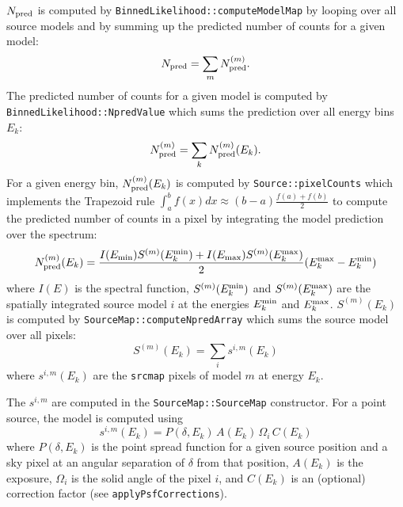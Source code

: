 \documentclass{article}[12pt,a4]
\begin{document}
$N_{\rm pred}$ is computed by
{\tt BinnedLikelihood::computeModelMap}
by looping over all source models and by summing up the predicted number of
counts for a given model:
\begin{equation}
N_{\rm pred} = \sum_m N_{\rm pred}^{(m)} .
\end{equation}
The predicted number of counts for a given model is computed by
{\tt BinnedLikelihood::NpredValue}
which sums the prediction over all energy bins $E_k$:
\begin{equation}
N_{\rm pred}^{(m)} = \sum_k N_{\rm pred}^{(m)}(E_k) .
\end{equation}
For a given energy bin, $N_{\rm pred}^{(m)}(E_k)$ is computed by 
{\tt Source::pixelCounts} which implements the Trapezoid rule
$\int_a^b f(x) dx \approx (b-a) \frac{f(a) + f(b)}{2}$
to compute the predicted number of counts in a pixel by integrating the
model prediction over the spectrum:
\begin{equation}
N_{\rm pred}^{(m)}(E_k) = \frac{
I(E_{\rm min}) S^{(m)}(E_k^{\rm min}) + I(E_{\rm max}) S^{(m)}(E_k^{\rm max})}{2} 
( E_k^{\rm max} - E_k^{\rm min} )
\end{equation}
where
$I(E)$ is the spectral function,
$S^{(m)}(E_k^{\rm min})$ and $S^{(m)}(E_k^{\rm max})$ are the spatially integrated source
model $i$ at the energies $E_k^{\rm min}$ and $E_k^{\rm max}$.
$S^{(m)}(E_k)$ is computed by
{\tt SourceMap::computeNpredArray}
which sums the source model over all pixels:
\begin{equation}
S^{(m)}(E_k) = \sum_i s^{i,m}(E_k)
\end{equation}
where
$s^{i,m}(E_k)$ are the {\tt srcmap} pixels of model $m$ at energy $E_k$.

The $s^{i,m}$ are computed in the {\tt SourceMap::SourceMap} constructor.
For a point source, the model is computed using
\begin{equation}
s^{i,m}(E_k) = P(\delta, E_k) \, A(E_k) \, \Omega_i \, C(E_k)
\end{equation}
where
$P(\delta, E_k)$ is the point spread function for a given source position and
a sky pixel at an angular separation of $\delta$ from that position,
$A(E_k)$ is the exposure,
$\Omega_i$ is the solid angle of the pixel $i$, and
$C(E_k)$ is an (optional) correction factor (see {\tt applyPsfCorrections}).
\end{document}

